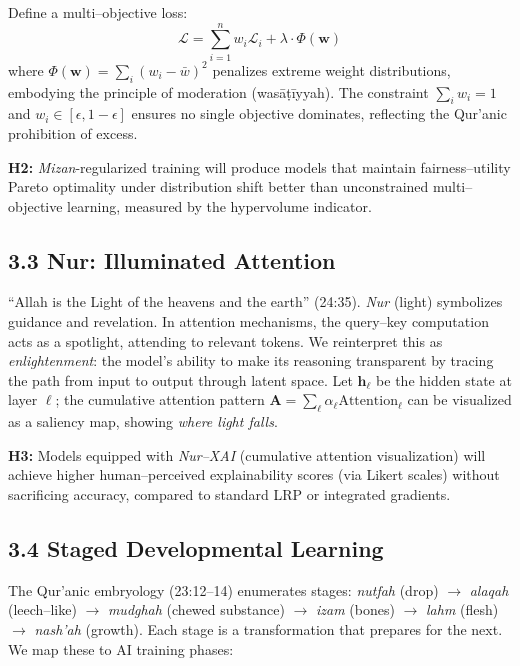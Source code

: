 \documentclass[12pt,twocolumn]{article}
\begin{document}
Define a multi--objective loss:
\begin{equation}
\mathcal{L} = \sum_{i=1}^n w_i \mathcal{L}_i + \lambda \cdot \Phi(\mathbf{w})
\end{equation}
where $\Phi(\mathbf{w}) = \sum_i (w_i - \bar{w})^2$ penalizes extreme weight distributions, embodying the principle of moderation (wasāṭīyyah). The constraint $\sum_i w_i = 1$ and $w_i \in [\epsilon, 1-\epsilon]$ ensures no single objective dominates, reflecting the Qur'anic prohibition of excess.

\textbf{H2:} \emph{Mizan}-regularized training will produce models that maintain fairness--utility Pareto optimality under distribution shift better than unconstrained multi--objective learning, measured by the hypervolume indicator.

\subsection*{3.3 Nur: Illuminated Attention}
``Allah is the Light of the heavens and the earth'' (24:35). \emph{Nur} (light) symbolizes guidance and revelation. In attention mechanisms, the query--key computation acts as a spotlight, attending to relevant tokens. We reinterpret this as \emph{enlightenment}: the model's ability to make its reasoning transparent by tracing the path from input to output through latent space. Let $\mathbf{h}_\ell$ be the hidden state at layer $\ell$; the cumulative attention pattern $\mathbf{A} = \sum_{\ell} \alpha_\ell \text{Attention}_\ell$ can be visualized as a saliency map, showing \emph{where light falls}.

\textbf{H3:} Models equipped with \emph{Nur--XAI} (cumulative attention visualization) will achieve higher human--perceived explainability scores (via Likert scales) without sacrificing accuracy, compared to standard LRP or integrated gradients.

\subsection*{3.4 Staged Developmental Learning}
The Qur'anic embryology (23:12--14) enumerates stages: \emph{nutfah} (drop) $\to$ \emph{alaqah} (leech--like) $\to$ \emph{mudghah} (chewed substance) $\to$ \emph{izam} (bones) $\to$ \emph{lahm} (flesh) $\to$ \emph{nash'ah} (growth). Each stage is a transformation that prepares for the next. We map these to AI training phases:
\end{document}
